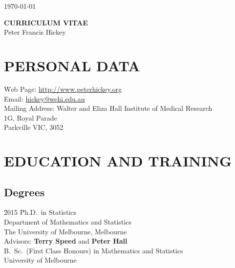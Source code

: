\documentclass[11pt,letterpaper,pdf]{article}
\begin{document}
\hfill \today

\begin{center}
{\bf \Large CURRICULUM VITAE}\\
\vspace*{5mm}
{\Large Peter Francis Hickey}
\end{center}


\section*{PERSONAL DATA}


\begin{tabbing}
  \= Web Page:\hspace*{2cm}
  \=\href{http://www.peterhickey.org}{http://www.peterhickey.org} \\
  \> Email: \>\href{mailto:hickey@wehi.edu.au}{hickey@wehi.edu.au} \\
  \> Mailing Address: \>Walter and Eliza Hall Institute of Medical Research\\
  \> \>1G, Royal Parade\\
  \> \>Parkville VIC, 3052\\
\end{tabbing}


\section*{EDUCATION AND TRAINING}

\subsection*{Degrees}

\begin{tabbing}
  \=2015 \hspace*{1.5cm} \=Ph.D.\ in Statistics\\
  \>\>Department of Mathematics and Statistics\\
  \>\>The University of Melbourne, Melbourne \\
  \>\>Advisors: \textbf{Terry Speed} and \textbf{Peter Hall}\\
    \>B.\ Sc.\ (First Class Honours) in Mathematics and Statistics \\
    \>\>University of Melbourne
\end{tabbing}
\end{document}
